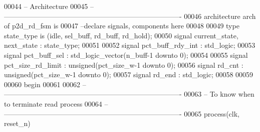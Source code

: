 \begin{DoxyCode}
00044 \textcolor{keyword}{-- Architecture}
00045 \textcolor{keyword}{-- ----------------------------------------------------------------------------}
00046 \textcolor{keywordflow}{architecture} arch \textcolor{keywordflow}{of} p2d_rd_fsm is
00047 \textcolor{keyword}{--declare signals,  components here}
00048 
00049 \textcolor{keywordflow}{type} \textcolor{vhdlchar}{state_type} \textcolor{keywordflow}{is} \textcolor{vhdlchar}{(}\textcolor{vhdlchar}{idle}\textcolor{vhdlchar}{,} \textcolor{vhdlchar}{sel\_buff}\textcolor{vhdlchar}{,} \textcolor{vhdlchar}{rd\_buff}\textcolor{vhdlchar}{,} \textcolor{vhdlchar}{rd\_hold}\textcolor{vhdlchar}{)};
00050 \textcolor{keywordflow}{signal} \textcolor{vhdlchar}{current_state}\textcolor{vhdlchar}{,} \textcolor{vhdlchar}{next_state} \textcolor{vhdlchar}{:} \textcolor{vhdlchar}{state_type};   
00051 
00052 \textcolor{keywordflow}{signal} \textcolor{vhdlchar}{pct_buff_rdy_int}    \textcolor{vhdlchar}{:} \textcolor{comment}{std\_logic};
00053 \textcolor{keywordflow}{signal} \textcolor{vhdlchar}{pct_buff_sel}        \textcolor{vhdlchar}{:} \textcolor{comment}{std\_logic\_vector}\textcolor{vhdlchar}{(}\textcolor{vhdlchar}{n_buff}\textcolor{vhdlchar}{-}\textcolor{vhdllogic}{}\textcolor{vhdllogic}{1} \textcolor{keywordflow}{downto} \textcolor{vhdllogic}{}\textcolor{vhdllogic}{0}\textcolor{vhdlchar}{)};
00054 
00055 \textcolor{keywordflow}{signal} \textcolor{vhdlchar}{pct_size_rd_limit}   \textcolor{vhdlchar}{:} \textcolor{comment}{unsigned}\textcolor{vhdlchar}{(}\textcolor{vhdlchar}{pct_size_w}\textcolor{vhdlchar}{-}\textcolor{vhdllogic}{}\textcolor{vhdllogic}{1} \textcolor{keywordflow}{downto} \textcolor{vhdllogic}{}\textcolor{vhdllogic}{0}\textcolor{vhdlchar}{)}; 
00056 \textcolor{keywordflow}{signal} \textcolor{vhdlchar}{rd_cnt}              \textcolor{vhdlchar}{:} \textcolor{comment}{unsigned}\textcolor{vhdlchar}{(}\textcolor{vhdlchar}{pct_size_w}\textcolor{vhdlchar}{-}\textcolor{vhdllogic}{}\textcolor{vhdllogic}{1} \textcolor{keywordflow}{downto} \textcolor{vhdllogic}{}\textcolor{vhdllogic}{0}\textcolor{vhdlchar}{)};
00057 \textcolor{keywordflow}{signal} \textcolor{vhdlchar}{rd_end}              \textcolor{vhdlchar}{:} \textcolor{comment}{std\_logic};
00058 
00059 
00060 \textcolor{vhdlkeyword}{begin}
00061 
00062 \textcolor{keyword}{-- ----------------------------------------------------------------------------}
00063 \textcolor{keyword}{-- To know when to terminate read process}
00064 \textcolor{keyword}{-- ----------------------------------------------------------------------------}
00065 \textcolor{keywordflow}{process}(clk, reset_n)

\end{DoxyCode}
